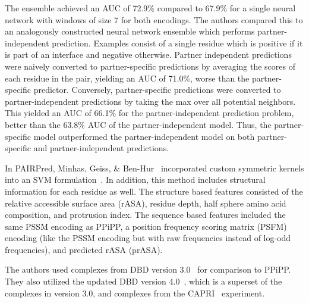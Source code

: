 The ensemble achieved an AUC of 72.9\% compared to 67.9\% for a single neural network with windows of size 7 for both encodings.
The authors compared this to an analogously constructed neural network ensemble which performs partner-independent prediction.
Examples consist of a single residue which is positive if it is part of an interface and negative otherwise.
Partner independent predictions were naively converted to partner-specific predictions by averaging the scores of each residue in the pair, yielding an AUC of 71.0\%, worse than the partner-specific predictor.
Conversely, partner-specific predictions were converted to partner-independent predictions by taking the max over all potential neighbors. 
This yielded an AUC of 66.1\% for the partner-independent prediction problem, better than the 63.8\% AUC of the partner-independent model.
Thus, the partner-specific model outperformed the partner-independent model on both partner-specific and partner-independent predictions.

In PAIRPred, Minhas, Geiss, \& Ben-Hur~\cite{minhas2014} incorporated custom symmetric kernels into an SVM formulation~\cite{minhas2014}.
In addition, this method includes structural information for each residue as well.
The structure based features consisted of the relative accessible surface area (rASA), residue depth, half sphere amino acid composition, and protrusion index.
The sequence based features included the same PSSM encoding as PPiPP, a position frequency scoring matrix (PSFM) encoding (like the PSSM encoding but with raw frequencies instead of log-odd frequencies), and predicted rASA (prASA).

The authors used complexes from DBD version 3.0~\cite{hwang2008} for comparison to PPiPP.
They also utilized the updated DBD version 4.0~\cite{hwang2010}, which is a superset of the complexes in version 3.0, and complexes from the CAPRI~\cite{janin2013} experiment.

